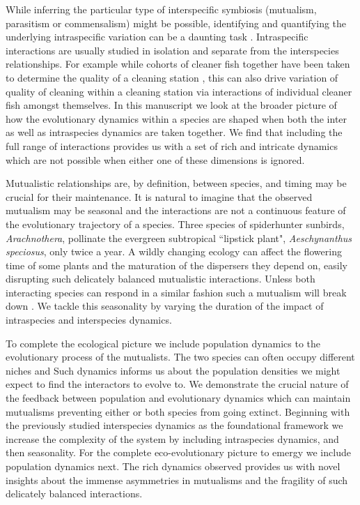\documentclass[12pt]{article}
\begin{document}
While inferring the particular type of interspecific symbiosis (mutualism, parasitism or commensalism) might be possible, identifying and quantifying the underlying intraspecific variation can be a daunting task \citep{behm:JE:2014}.  
Intraspecific interactions are usually studied in isolation and separate from the interspecies relationships.
For example while cohorts of cleaner fish together have been taken to determine the quality of a cleaning station \citep{bshary:AB:2002,bshary:book:2003}, this can also drive variation of quality of cleaning within a cleaning station via interactions of individual cleaner fish amongst themselves.  
In this manuscript we look at the broader picture of how the evolutionary
dynamics within a species are shaped when both the inter as well as intraspecies
dynamics are taken together. 
We find that including the full range of interactions provides us with a set of rich and intricate dynamics which are not possible when either one of these dimensions is ignored.

Mutualistic relationships are, by definition, between species, and timing may be crucial for their maintenance. 
It is natural to imagine that the observed mutualism may be seasonal and the interactions are not a continuous feature of the evolutionary trajectory of a species. 
Three species of spiderhunter sunbirds, \textit{Arachnothera}, pollinate the evergreen subtropical ``lipstick plant", \textit{Aeschynanthus speciosus}, only twice a year.
A wildly changing ecology can affect the flowering time of some plants and the maturation of the dispersers they depend on, easily disrupting such delicately balanced mutualistic interactions. 
Unless both interacting species can respond in a similar fashion such a mutualism will break down \citep{warren:GCB:2014}.
We tackle this seasonality by varying the duration of the impact of intraspecies and interspecies dynamics.

To complete the ecological picture we include population dynamics to the evolutionary process of the mutualists.
The two species can often occupy different niches and 
Such dynamics informs us about the population densities we might expect to find the interactors to evolve to.
We demonstrate the crucial nature of the feedback between population and evolutionary dynamics which can maintain mutualisms preventing either or both species from going extinct. 
Beginning with the previously studied interspecies dynamics as the foundational framework \citep{gokhale:PRSB:2012} we increase the complexity of the system by including intraspecies dynamics, and then seasonality.
For the complete eco-evolutionary picture to emergy we include population dynamics next.
The rich dynamics observed provides us with novel insights about the immense asymmetries in mutualisms and the fragility of such delicately balanced interactions.
\end{document}
